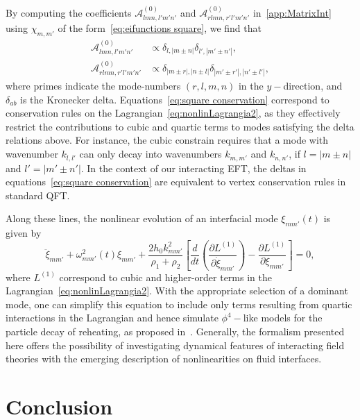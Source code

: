 \documentclass[a4paper]{jpconf}
\newcommand{\pow}[2]{#1^{(#2)}}
\begin{document}
By computing the coefficients $\pow{\mathcal{A}}{0}_{lmn,l' m' n'}$ and $\pow{\mathcal{A}}{0}_{rlmn,r' l' m' n'}$ in~\ref{app:MatrixInt} using $\chi_{m,m'}$ of the form~\eqref{eq:eifunctions square}, we find that
\begin{subequations}
\label{eq:square conservation}
\begin{align}
    \pow{\mathcal{A}}{0}_{lmn,l' m' n'} &\propto \delta_{l,|m\pm n|}\delta_{l',|m'\pm n'|}, \\
    \pow{\mathcal{A}}{0}_{rlmn,r' l' m' n'} &\propto \delta_{|m\pm r|,|n\pm l|}\delta_{|m'\pm r'|,|n'\pm l'|},
\end{align}    
\end{subequations}
where primes indicate the mode-numbers $(r,l,m,n)$ in the $y-$direction, and $\delta_{ab}$ is the Kronecker delta. Equations~\eqref{eq:square conservation} correspond to conservation rules on the Lagrangian~\eqref{eq:nonlinLagrangia2}, as they effectively restrict the contributions to cubic and quartic terms to modes satisfying the delta relations above. For instance, the cubic constrain requires that a mode with wavenumber $k_{l,l'}$ can only decay into wavenumbers $k_{m,m'}$ and $k_{n,n'}$, if $l=|m\pm n|$ and $l'=|m'\pm n'|$. In the context of our interacting EFT, the deltas in equations~\eqref{eq:square conservation} are equivalent to vertex conservation rules in standard QFT. 

Along these lines, the nonlinear evolution of an interfacial mode $\xi_{mm'}(t)$ is given by
\begin{equation}
    \ddot{\xi}_{mm'}+\omega_{mm'}^2(t)\xi_{mm'}+ \frac{2h_0k_{mm'}^2}{\rho_1+\rho_2}\left[\frac{d}{dt}\left(\frac{\partial \pow{L}{1}}{\partial \dot{\xi}_{mm'}}\right)-\frac{\partial \pow{L}{1}}{\partial \xi_{mm'}}\right]=0,
\end{equation}
where $\pow{L}{1}$ correspond to cubic and higher-order terms in the Lagrangian~\eqref{eq:nonlinLagrangia2}. With the appropriate selection of a dominant mode, one can simplify this equation to include only terms resulting from quartic interactions in the Lagrangian and hence simulate $\phi^4-$like models for the particle decay of reheating, as proposed in~\cite{barroso2022primary}. Generally, the formalism presented here offers the possibility of investigating dynamical features of interacting field theories with the emerging description of nonlinearities on fluid interfaces. 

\section{Conclusion}
\end{document}
